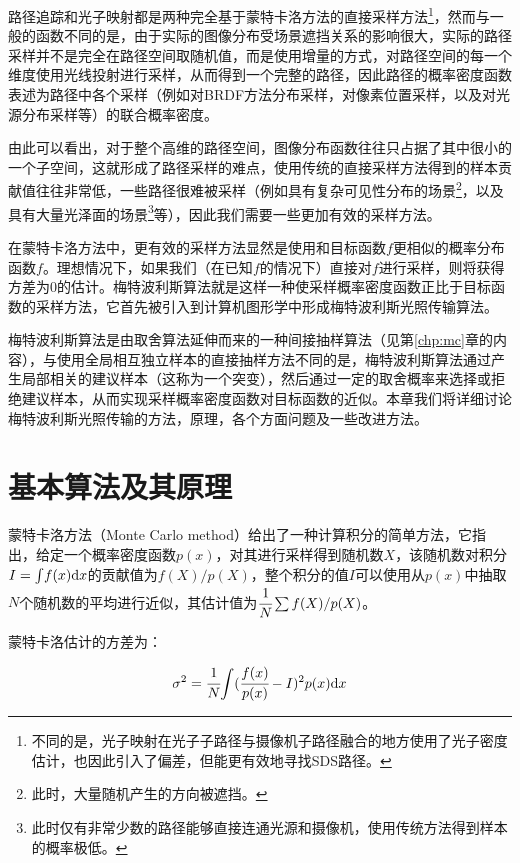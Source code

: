 路径追踪和光子映射都是两种完全基于蒙特卡洛方法的直接采样方法\footnote{不同的是，光子映射在光子子路径与摄像机子路径融合的地方使用了光子密度估计，也因此引入了偏差，但能更有效地寻找SDS路径。}，然而与一般的函数不同的是，由于实际的图像分布受场景遮挡关系的影响很大，实际的路径采样并不是完全在路径空间取随机值，而是使用增量的方式，对路径空间的每一个维度使用光线投射进行采样，从而得到一个完整的路径，因此路径的概率密度函数表述为路径中各个采样（例如对BRDF方法分布采样，对像素位置采样，以及对光源分布采样等）的联合概率密度。

由此可以看出，对于整个高维的路径空间，图像分布函数往往只占据了其中很小的一个子空间，这就形成了路径采样的难点，使用传统的直接采样方法得到的样本贡献值往往非常低，一些路径很难被采样（例如具有复杂可见性分布的场景\footnote{此时，大量随机产生的方向被遮挡。}，以及具有大量光泽面的场景\footnote{此时仅有非常少数的路径能够直接连通光源和摄像机，使用传统方法得到样本的概率极低。}等），因此我们需要一些更加有效的采样方法。

在蒙特卡洛方法中，更有效的采样方法显然是使用和目标函数$f$更相似的概率分布函数$f$。理想情况下，如果我们（在已知$f$的情况下）直接对$f$进行采样，则将获得方差为0的估计。梅特波利斯算法就是这样一种使采样概率密度函数正比于目标函数的采样方法，它首先被\cite{a:MetropolisLightTransport}引入到计算机图形学中形成梅特波利斯光照传输算法。

梅特波利斯算法是由取舍算法延伸而来的一种间接抽样算法（见第\ref{chp:mc}章的内容），与使用全局相互独立样本的直接抽样方法不同的是，梅特波利斯算法通过产生局部相关的建议样本（这称为一个突变），然后通过一定的取舍概率来选择或拒绝建议样本，从而实现采样概率密度函数对目标函数的近似。本章我们将详细讨论梅特波利斯光照传输的方法，原理，各个方面问题及一些改进方法。





\section{基本算法及其原理}\label{sec:mlt-mlt}
蒙特卡洛方法（Monte Carlo method）给出了一种计算积分的简单方法，它指出，给定一个概率密度函数$p(x)$，对其进行采样得到随机数$X$，该随机数对积分$I={\rm \int} f(x){\rm d}x$的贡献值为$f(X)/p(X)$，整个积分的值$I$可以使用从$p(x)$中抽取$N$个随机数的平均进行近似，其估计值为$ \cfrac{1}{N}\sum f(X)/p(X)$。

蒙特卡洛估计的方差为：

\begin{equation}
	\sigma^{2}= \cfrac{1}{N}{\rm \int} ( \cfrac{f(x)}{p(x)}-I)^{2}p(x){\rm d}x
\end{equation}

